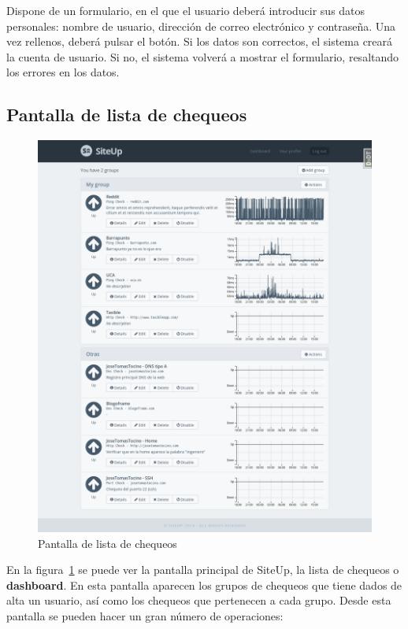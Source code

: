 Dispone de un formulario, en el que el usuario deberá introducir sus datos
personales: nombre de usuario, dirección de correo electrónico y contraseña. Una
vez rellenos, deberá pulsar el botón. Si los datos son correctos, el sistema
creará la cuenta de usuario. Si no, el sistema volverá a mostrar el formulario,
resaltando los errores en los datos.


\subsection{Pantalla de lista de chequeos}

\begin{figure}[htbp]
  \centering
  \includegraphics[width=\textwidth]{5_diseno/web-dashboard}
  \caption{Pantalla de lista de chequeos}
  \label{fig:web-dashboard}
\end{figure}

En la figura~\ref{fig:web-dashboard} se puede ver la pantalla principal de
SiteUp, la lista de chequeos o \textbf{dashboard}. En esta pantalla aparecen los
grupos de chequeos que tiene dados de alta un usuario, así como los chequeos que
pertenecen a cada grupo. Desde esta pantalla se pueden hacer un gran número de
operaciones:

